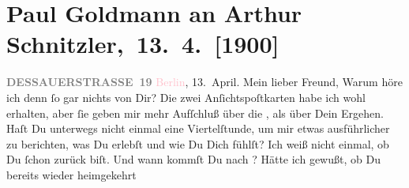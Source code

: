 

         
         \renewcommand{\erwaehntePersonen}{Personen: Eberhard König, Agnes Sorma}
         \renewcommand{\erwaehnteOrte}{Orte: Berlin, Dessauer Straße, Lessing-Theater, Schauspielhaus, Wien}
         \renewcommand{\erwaehnteWerke}{Werke: Gevatter Tod. Ein Märchen von der Menschheit. Drama in fünf Aufzügen, Liebelei. Schauspiel in drei Akten}
               \section[ Paul Goldmann an Arthur Schnitzler, 13. 4. {[}1900{]}]{Paul Goldmann an Arthur Schnitzler, 13. 4. {[}1900{]}}\nopagebreak{}\rehead{ }\normalsize\beginnumbering{} \toendnotes[C]{\smallbreak\pagebreak[2]} 
\toendnotes[C]{\smallbreak}\pstart
           \noindent{}{\pb}\textcolor{pink}{\textcolor{gray}{\textbf{DESSAUERSTRASSE 19}}}{}\ledrightnote{\textcolor{pink}{Dessauer Straße}}\pend
           \pstart
           \raggedleft{}\textcolor{pink}{Berlin}{}\ledrightnote{\textcolor{pink}{Berlin}}, 13. April.\pend
           \pstart{}Mein lieber Freund,\pend\pstart
           Warum höre ich denn ſo gar nichts von Dir? Die zwei Anſichtspoſtkarten habe ich wohl
               erhalten, aber ſie geben mir mehr Aufſchluß über die \label{K_L02910-1v}\label{K_L02910-1h}, als über Dein Ergehen. Haſt Du unterwegs nicht einmal eine Viertelſtunde, um
               mir etwas ausführlicher zu berichten, was Du erlebſt und wie Du Dich fühlſt? Ich weiß
               nicht einmal, ob Du ſchon zurück biſt. Und wann kommſt Du nach \label{K_L02910-2v}\label{K_L02910-2h}?
               Hätte ich gewußt, ob Du bereits wieder {\pb}heimgekehrt
